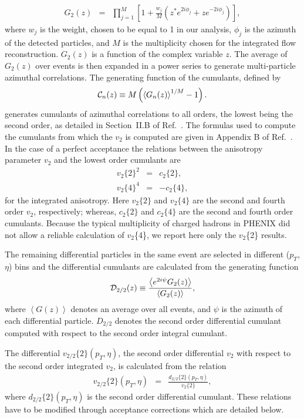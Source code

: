 \documentclass[aps,prc,superscriptaddress,showpacs,floatfix,twocolumn]{revtex4}
\def\v2{\mbox{$v_2$}}
\newcommand \pt{\mbox{$p_T$}\xspace}
\newcommand \mean[1]{\left\langle #1 \right\rangle}
\begin{document}
\begin{eqnarray}
\label{genfunc}
G_2(z) & = & \prod_{j=1}^M  \left[ 1+\frac{w_j}{M}( z^* e^{2i\phi_j} 
+ z e^{-2i\phi_j})\right],
\end{eqnarray}
where $w_j $ is the weight, chosen to be equal to 1 in our analysis, $\phi_j$ is the azimuth of the detected 
particles, and $M$ is the multiplicity chosen for the integrated flow reconstruction. $G_2(z)$ is a function 
of the complex variable $z$. The average of $G_2(z)$ over events is then expanded in a power series to 
generate multi-particle azimuthal correlations. The generating function of the cumulants, defined by
\begin{equation}
\label{defc0}
{\cal C}_n(z)\equiv
M\left(\mean{G_n(z)}^{1/M}-1\right).
\end{equation}
generates cumulants of azimuthal correlations to all orders, the lowest being the second order, as detailed in 
Section~II.B of Ref.~\cite{Borghini:2001vi}. The formulas used to compute the cumulants from 
which the $v_2$ is computed 
are given in Appendix B of Ref.~\cite{Borghini:2001vi}. In the case of a perfect acceptance 
the relations between 
the anisotropy parameter $v_2$ and the lowest order cumulants are 
\begin{eqnarray}
\label{v2int}
v_2\{2\}^2 & = & c_2\{2\}, \\
v_2\{4\}^4 & = & -c_2\{4\}, 
\end{eqnarray}
for the integrated anisotropy. Here $v_2\{2\}$ and $v_2\{4\}$ 
are the second and fourth order $v_2$, respectively; whereas, 
$c_2\{2\}$ and $c_2\{4\}$ are the second and fourth order 
cumulants.  Because the typical multiplicity of charged hadrons 
in PHENIX did not allow a reliable calculation of $v_2$\{4\}, we 
report here only the $v_2$\{2\} results.

The remaining differential particles in the same event are selected in different (\pt, $\eta$) bins and 
the differential cumulants are calculated from the generating function
\begin{eqnarray}
\label{defcm}
{\cal D}_{2/2}(z)
\equiv\frac{\mean{e^{2i\psi}G_2(z)}}{\mean{G_2(z)}},
\end{eqnarray}
where $\mean{G(z)}$ denotes an average over all events, and $\psi$ is the azimuth of each differential particle.
$D_{2/2}$ denotes the second order differential cumulant computed with respect to the second order integral
cumulant.

The differential $v_{2/2}\{2\}(\pt,\eta)$, the second order differential \v2 with respect to the second order 
integrated \v2, is calculated from the relation
\begin{eqnarray}
\label{v2diff}
v_{2/2}\{2\}(\pt,\eta) & = &  \frac{d_{2/2}\{2\}(\pt,\eta)}{v_{2}\{2\}}, 
\end{eqnarray}
where $d_{2/2}\{2\}(\pt,\eta)$ is the second order differential cumulant. These relations have to be modified 
through acceptance corrections which are detailed below.
\end{document}
